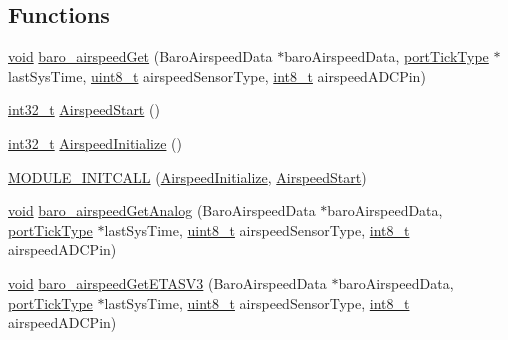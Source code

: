 \subsection*{Functions}
\begin{DoxyCompactItemize}
\item 
\hyperlink{group___n_a_m_e_ga18028b8badbf1ea7e704ccac3c488e82}{void} \hyperlink{group___airspeed_module_ga76db67751a27b3bcbf75e88ee48148fb}{baro\-\_\-airspeed\-Get} (Baro\-Airspeed\-Data $\ast$baro\-Airspeed\-Data, \hyperlink{_s_t_m32_f10x_2_libraries_2_free_r_t_o_s_2_source_2portable_2_g_c_c_2_a_r_m___c_m3_2portmacro_8h_a4d746b2ff8fafc490b764c66411ec457}{port\-Tick\-Type} $\ast$last\-Sys\-Time, \hyperlink{stdint_8h_aba7bc1797add20fe3efdf37ced1182c5}{uint8\-\_\-t} airspeed\-Sensor\-Type, \hyperlink{stdint_8h_ad566f6541e98b74246db1a3a3a85ad49}{int8\-\_\-t} airspeed\-A\-D\-C\-Pin)
\item 
\hyperlink{group___n_a_m_e_gafd12020da5a235dfcf0c3c748fb5baed}{int32\-\_\-t} \hyperlink{group___airspeed_module_ga4e599df9b683a64cb49340f7d0386be5}{Airspeed\-Start} ()
\item 
\hyperlink{group___n_a_m_e_gafd12020da5a235dfcf0c3c748fb5baed}{int32\-\_\-t} \hyperlink{group___airspeed_module_ga3e08decda04632d5570c9a030a96041f}{Airspeed\-Initialize} ()
\item 
\hyperlink{group___airspeed_module_ga21ecf0efa7ca0f9597649aa8babdc8b0}{M\-O\-D\-U\-L\-E\-\_\-\-I\-N\-I\-T\-C\-A\-L\-L} (\hyperlink{group___airspeed_module_ga3e08decda04632d5570c9a030a96041f}{Airspeed\-Initialize}, \hyperlink{group___airspeed_module_ga4e599df9b683a64cb49340f7d0386be5}{Airspeed\-Start})
\item 
\hyperlink{group___n_a_m_e_ga18028b8badbf1ea7e704ccac3c488e82}{void} \hyperlink{group___airspeed_module_ga11ad675f5f7a043d2cfaada3edf7ae6e}{baro\-\_\-airspeed\-Get\-Analog} (Baro\-Airspeed\-Data $\ast$baro\-Airspeed\-Data, \hyperlink{_s_t_m32_f10x_2_libraries_2_free_r_t_o_s_2_source_2portable_2_g_c_c_2_a_r_m___c_m3_2portmacro_8h_a4d746b2ff8fafc490b764c66411ec457}{port\-Tick\-Type} $\ast$last\-Sys\-Time, \hyperlink{stdint_8h_aba7bc1797add20fe3efdf37ced1182c5}{uint8\-\_\-t} airspeed\-Sensor\-Type, \hyperlink{stdint_8h_ad566f6541e98b74246db1a3a3a85ad49}{int8\-\_\-t} airspeed\-A\-D\-C\-Pin)
\item 
\hyperlink{group___n_a_m_e_ga18028b8badbf1ea7e704ccac3c488e82}{void} \hyperlink{group___airspeed_module_ga220f144f081ac5d6b18383754ef0572f}{baro\-\_\-airspeed\-Get\-E\-T\-A\-S\-V3} (Baro\-Airspeed\-Data $\ast$baro\-Airspeed\-Data, \hyperlink{_s_t_m32_f10x_2_libraries_2_free_r_t_o_s_2_source_2portable_2_g_c_c_2_a_r_m___c_m3_2portmacro_8h_a4d746b2ff8fafc490b764c66411ec457}{port\-Tick\-Type} $\ast$last\-Sys\-Time, \hyperlink{stdint_8h_aba7bc1797add20fe3efdf37ced1182c5}{uint8\-\_\-t} airspeed\-Sensor\-Type, \hyperlink{stdint_8h_ad566f6541e98b74246db1a3a3a85ad49}{int8\-\_\-t} airspeed\-A\-D\-C\-Pin)

\end{DoxyCompactItemize}
